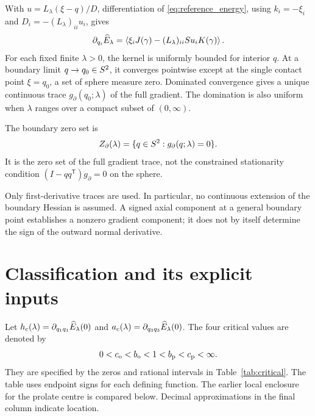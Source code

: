 With $u=L_\lambda(\xi-q)/D$, differentiation of \eqref{eq:reference_energy}, using $k_i=-\xi_i$ and $D_i=-(L_\lambda)_{ii}u_i$, gives
\begin{equation}\label{eq:gradient}
 \partial_{q_i}\widehat E_\lambda
 =\left\langle \xi_iJ(\gamma)-(L_\lambda)_{ii}S u_iK(\gamma)\right\rangle.
\end{equation}
For each fixed finite $\lambda>0$, the kernel is uniformly bounded for interior $q$. At a boundary limit $q\to q_0\in S^2$, it converges pointwise except at the single contact point $\xi=q_0$, a set of sphere measure zero. Dominated convergence gives a unique continuous trace $g_\partial(q_0;\lambda)$ of the full gradient. The domination is also uniform when $\lambda$ ranges over a compact subset of $(0,\infty)$.

\begin{definition}\label{def:boundary}
The boundary zero set is
\begin{equation}\label{eq:boundary}
 Z_\partial(\lambda)=\{q\in S^2:g_\partial(q;\lambda)=0\}.
\end{equation}
It is the zero set of the full gradient trace, not the constrained stationarity condition $(I-qq^{\mathsf T})g_\partial=0$ on the sphere.
\end{definition}

Only first-derivative traces are used. In particular, no continuous extension of the boundary Hessian is assumed. A signed axial component at a general boundary point establishes a nonzero gradient component; it does not by itself determine the sign of the outward normal derivative.

\section{Classification and its explicit inputs}\label{sec:classification}

Let $h_c(\lambda)=\partial_{q_1q_1}\widehat E_\lambda(0)$ and $a_c(\lambda)=\partial_{q_3q_3}\widehat E_\lambda(0)$. The four critical values are denoted by
\[
 0<c_{\mathrm o}<b_{\mathrm o}<1<b_{\mathrm p}<c_{\mathrm p}<\infty.
\]
They are specified by the zeros and rational intervals in Table~\ref{tab:critical}. The table uses endpoint signs for each defining function. The earlier local enclosure for the prolate centre is compared below. Decimal approximations in the final column indicate location.

